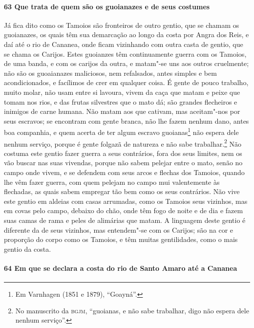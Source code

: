 \paragraph{63 Que trata de quem são os guoianazes e de seus costumes}

Já fica dito como os Tamoios são fronteiros de outro gentio, que se chamam os guoianazes,
os quais têm sua demarcação ao longo da costa por Angra dos Reis, e daí até o rio de
Cananea, onde ficam vizinhando com outra casta de gentio, que se chama os Carijos. Estes
guoianzes têm continuamente guerra com os Tamoios, de uma banda, e com os carijos da
outra, e matam"-se uns aos outros cruelmente; não são os guoaianazes maliciosos, nem
refalsados, antes simples e bem acondicionados, e facílimos de crer em qualquer coisa. É
gente de pouco trabalho, muito molar, não usam entre si lavoura, vivem da caça que matam e
peixe que tomam nos rios, e das frutas silvestres que o mato dá; são grandes flecheiros e
inimigos de carne humana. Não matam aos que cativam, mas aceitam"-nos por seus escravos; se
encontram com gente branca, não lhe fazem nenhum dano, antes boa companhia, e quem acerta
de ter algum escravo guoianas\footnote{ Em Varnhagen (1851 e 1879), ``Goayná''.} não
espera dele nenhum serviço, porque é gente folgazã de natureza e não sabe
trabalhar.\footnote{ No manuscrito da \textsc{bgjm}, ``guoianas, e não sabe trabalhar,
digo não espera dele nenhum serviço''.} Não costuma este gentio fazer guerra a seus
contrários, fora dos seus limites, nem os vão buscar nas suas vivendas, porque não sabem
pelejar entre o mato, senão no campo onde vivem, e se defendem com seus arcos e flechas
dos Tamoios, quando lhe vêm fazer guerra, com quem pelejam no campo mui valentemente às
flechadas, as quais sabem empregar tão bem como os seus contrários. Não vive este gentio
em aldeias com casas arrumadas, como os Tamoios seus vizinhos, mas em covas pelo campo,
debaixo do chão, onde têm fogo de noite e de dia e fazem suas camas de rama e peles de
alimárias que matam. A linguagem deste gentio é diferente da de seus vizinhos, mas
entendem"-se com os Carijos; são na cor e proporção do corpo como os Tamoios, e têm muitas
gentilidades, como o mais gentio da costa.

\paragraph{64 Em que se declara a costa do rio de Santo Amaro até a Cananea}

